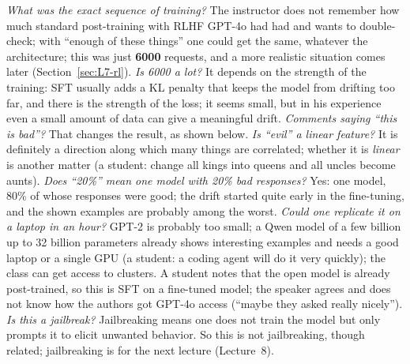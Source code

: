 \begin{discussion}
\emph{What was the exact sequence of training?} The instructor does not remember how much standard post-training with RLHF GPT-4o had had and wants to double-check; with ``enough of these things'' one could get the same, whatever the architecture; this was just \textbf{6000} requests, and a more realistic situation comes later (Section~\ref{sec:L7-rl}).
\emph{Is 6000 a lot?} It depends on the strength of the training: SFT usually adds a KL penalty that keeps the model from drifting too far, and there is the strength of the loss; it seems small, but in his experience even a small amount of data can give a meaningful drift.
\emph{Comments saying ``this is bad''?} That changes the result, as shown below.
\emph{Is ``evil'' a linear feature?} It is definitely a direction along which many things are correlated; whether it is \emph{linear} is another matter (a student: change all kings into queens and all uncles become aunts).
\emph{Does ``20\%'' mean one model with 20\% bad responses?} Yes: one model, 80\% of whose responses were good; the drift started quite early in the fine-tuning, and the shown examples are probably among the worst.
\emph{Could one replicate it on a laptop in an hour?} GPT-2 is probably too small; a Qwen model of a few billion up to 32 billion parameters already shows interesting examples and needs a good laptop or a single GPU (a student: a coding agent will do it very quickly); the class can get access to clusters. A student notes that the open model is already post-trained, so this is SFT on a fine-tuned model; the speaker agrees and does not know how the authors got GPT-4o access (``maybe they asked really nicely'').
\emph{Is this a jailbreak?} Jailbreaking means one does not train the model but only prompts it to elicit unwanted behavior. So this is not jailbreaking, though related; jailbreaking is for the next lecture (Lecture~8).
\end{discussion}

